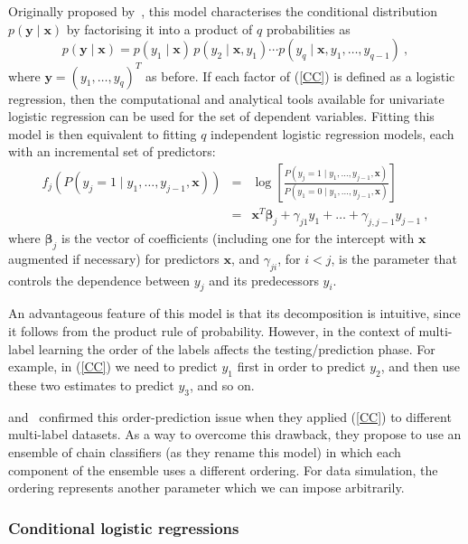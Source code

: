 \documentclass[review]{elsarticle}
\begin{document}
Originally proposed by~\citet{CHAIN}, this model characterises the conditional distribution $p(\mathbf{y}\mid\mathbf{x})$ by factorising it into a product of $q$ probabilities as
\begin{equation} \label{CC}
p(\mathbf{y}\mid\mathbf{x}) = p(y_{1}\mid\mathbf{x})\, p(y_{2}\mid\mathbf{x}, y_{1}) \cdots p(y_{q}\mid\mathbf{x}, y_{1},\ldots, y_{q-1})\ ,
\end{equation}
where $\mathbf{y}=\left(y_{1},\ldots,y_{q} \right)^T$ as before.
If each factor of (\ref{CC}) is defined as a logistic regression, then the computational and analytical tools available for univariate logistic regression can be used for the set of dependent variables. Fitting this model is then equivalent to fitting $q$ independent logistic regression models, each with an incremental set of predictors:
\begin{eqnarray}
f_{j} \left( P(y_{j} = 1 \mid y_{1},\ldots,y_{j-1},\mathbf{x}) \right) &=& \log \left[ \frac{P(y_{j} = 1\mid y_{1},\ldots,y_{j-1},\mathbf{x})}{P(y_{1} = 0\mid y_{1},\ldots,y_{j-1},\mathbf{x})} \right] \nonumber\\
&=& \mathbf{x}^T \bm{\beta}_j + \gamma_{j1} y_{1} + \ldots + \gamma_{j,j-1} y_{j-1}\ ,
\label{eq:cc}
\end{eqnarray}
where $\bm{\beta}_{j}$ is the vector of coefficients (including one for the intercept with $\mathbf{x}$ augmented if necessary) for predictors $\mathbf{x}$, and $\gamma_{ji}$, for $i<j$, is the parameter that controls the dependence between $y_{j}$ and its predecessors $y_{i}$. 

An advantageous feature of this model is that its decomposition is intuitive, since it follows from the product rule of probability. However, in the context of multi-label learning the order of the labels affects the testing/prediction phase. For example, in (\ref{CC}) we need to predict $y_{1}$ first in order to predict $y_{2}$, and then use these two estimates to predict $y_{3}$, and so on.

\citet{OCC} and~\citet{PCC} confirmed this order-prediction issue when they applied (\ref{CC}) to different multi-label datasets. As a way to overcome this drawback, they propose to use an ensemble of chain classifiers (as they rename this model) in which each component of the ensemble uses a different ordering. For data simulation, the ordering represents another parameter which we can impose arbitrarily.

\subsubsection{Conditional logistic regressions}
\end{document}
